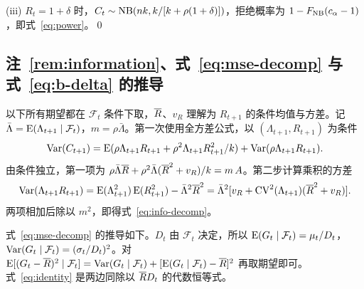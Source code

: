 (iii) $R_t=1+\delta$ 时，$C_t\sim\operatorname{NB}(nk,k/[k+\rho(1+\delta)])$，拒绝概率为 $1-F_{\operatorname{NB}}(c_\alpha-1)$，即式~\eqref{eq:power}。\qed

\subsection{\texorpdfstring{注~\ref{rem:information}、式~\eqref{eq:mse-decomp} 与式~\eqref{eq:b-delta} 的推导}{注 1、式 (12) 与式 (15) 的推导}}

以下所有期望都在 $\mathcal F_t$ 条件下取，$\overline{R}$、$v_R$ 理解为 $R_{t+1}$ 的条件均值与方差。记 $\bar\Lambda=\operatorname{E}(\Lambda_{t+1}\mid\mathcal F_t)$，$m=\rho\bar\Lambda$。第一次使用全方差公式，以 $(\Lambda_{t+1},R_{t+1})$ 为条件
\begin{equation*}
  \operatorname{Var}(C_{t+1})=\operatorname{E}(\rho\Lambda_{t+1}R_{t+1}+\rho^2\Lambda_{t+1}R_{t+1}^2/k)+\operatorname{Var}(\rho\Lambda_{t+1}R_{t+1}).
\end{equation*}
由条件独立，第一项为 $\rho\bar\Lambda\overline{R}+\rho^2\bar\Lambda(\overline{R}^2+v_R)/k=m\,A$。第二步计算乘积的方差
\begin{equation*}
  \operatorname{Var}(\Lambda_{t+1}R_{t+1})=\operatorname{E}(\Lambda_{t+1}^2)\operatorname{E}(R_{t+1}^2)-\bar\Lambda^2\overline{R}^2
  =\bar\Lambda^2[v_R+\operatorname{CV}^2(\Lambda_{t+1})(\overline{R}^2+v_R)].
\end{equation*}
两项相加后除以 $m^2$，即得式~\eqref{eq:info-decomp}。

式~\eqref{eq:mse-decomp} 的推导如下。$D_t$ 由 $\mathcal F_t$ 决定，所以 $\operatorname{E}(G_t\mid\mathcal F_t)=\mu_t/D_t$，$\operatorname{Var}(G_t\mid\mathcal F_t)=(\sigma_t/D_t)^2$。对 $\operatorname{E}[(G_t-\overline{R})^2\mid\mathcal F_t]=\operatorname{Var}(G_t\mid\mathcal F_t)+[\operatorname{E}(G_t\mid\mathcal F_t)-\overline{R}]^2$ 再取期望即可。式~\eqref{eq:identity} 是两边同除以 $\overline{R} D_t$ 的代数恒等式。

